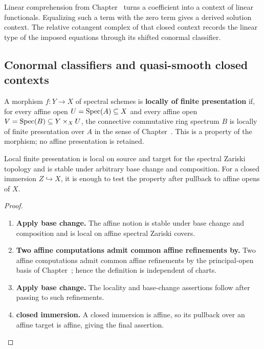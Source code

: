 Linear comprehension from Chapter~
turns a coefficient into a context of linear functionals. Equalizing such a
term with the zero term gives a derived solution context. The relative
cotangent complex of that closed context records the linear type of the imposed
equations through its shifted conormal classifier.

\subsection{Conormal classifiers and quasi-smooth closed contexts}

\begin{definition}
\label{def:global-locally-finite-presentation}
A morphism \(f:Y\to X\) of spectral schemes is \textbf{locally of finite
presentation} if, for every affine open \(U=\operatorname{Spec}(A)\subseteq X\) and every
affine open \(V=\operatorname{Spec}(B)\subseteq Y\times_XU\), the connective commutative
ring spectrum \(B\) is locally of finite presentation over \(A\) in the sense
of Chapter~. This is a property of the
morphism; no affine presentation is retained.
\end{definition}

\begin{proposition}
\label{prop:global-lfp-locality}
Local finite presentation is local on source and target for the spectral
Zariski topology and is stable under arbitrary base change and composition.
For a closed immersion \(Z\hookrightarrow X\), it is enough to test the
property after pullback to affine opens of \(X\).
\end{proposition}

\begin{proof}
\leavevmode
\begin{enumerate}[label=\textup{(\arabic*)}]
    \item \textbf{Apply base change.}
    The affine notion is stable under base change and composition and is local on affine
    spectral Zariski covers.

    \item \textbf{Two affine computations admit common affine refinements by.}
    Two affine computations admit common affine refinements by the principal-open basis of
    Chapter~; hence the definition is independent of
    charts.

    \item \textbf{Apply base change.}
    The locality and base-change assertions follow after passing to such refinements.

    \item \textbf{closed immersion.}
    A closed immersion is affine, so its pullback over an affine target is affine, giving the
    final assertion.
\end{enumerate}
\end{proof}

